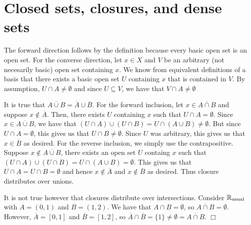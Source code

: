 \documentclass{article}
\begin{document}
\section{Closed sets, closures, and dense sets}

 {
    The forward direction follows by the definition because every basic open set is an open set. For the converse direction, let $x\in X$ and $V$ be an arbitrary (not necesarily basic) open set containing $x$. We know from equivalent definitions of a basis that there exists a basic open set $U$ containing $x$ that is contained in $V$. By assumption, $U\cap A\neq \emptyset$ and since $U\subseteq V$, we have that $V\cap A\neq \emptyset$
}

 {
    It is true that $\overline{A\cup B} = \overline{A}\cup \overline{B}$. For the forward inclusion, let $x\in \overline{A\cap B}$ and suppose $x\not\in \overline{A}$. Then, there exists $U$ containing $x$ such that $U\cap A = \emptyset$. Since $x\in \overline{A\cup B}$, we have that $(U\cap A)\cup (U\cap B) = U\cap (A\cup B) \neq \emptyset$. But since $U\cap A = \emptyset$, this gives us that $U\cap B \neq \emptyset$. Since $U$ was arbitrary, this gives us that $x\in \overline{B}$ as desired. For the reverse inclusion, we simply use the contrapositive. Suppose $x\not\in \overline{A\cup B}$, there exists an open set $U$ containg $x$ such that $(U\cap A)\cup (U\cap B) =  U\cap (A\cup B) = \emptyset$. This gives us that $U\cap A = U\cap B = \emptyset$ and hence $x\not \in \overline{A}$ and $x\not\in \overline{B}$ as desired. Thus closure distributes over unions.

    It is not true however that closures distribute over intersections. Consider $\mathbb{R}_{\text{usual}}$ with $A = (0,1)$ and $B = (1,2)$. We have that $A\cap B = \emptyset$, so $\overline{A\cap B} = \emptyset$. However, $\overline{A} = [0,1]$ and $\overline{B} = [1,2]$, so $\overline{A}\cap \overline{B} = \{1\}\neq \emptyset = \overline{A\cap B}$. $\Box$
}
\end{document}
